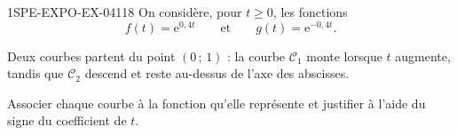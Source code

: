 \begin{exercice}{1SPE-EXPO-EX-041}{1}{8}
On considère, pour $t \geq 0$, les fonctions
\[f(t)=\mathrm{e}^{0{,}4t}\qquad\text{et}\qquad g(t)=\mathrm{e}^{-0{,}4t}.\]

Deux courbes partent du point $(0\,;\,1)$ : la courbe $\mathcal C_1$ monte lorsque $t$ augmente, tandis que $\mathcal C_2$ descend et reste au-dessus de l'axe des abscisses.

Associer chaque courbe à la fonction qu'elle représente et justifier à l'aide du signe du coefficient de $t$.
\end{exercice}
